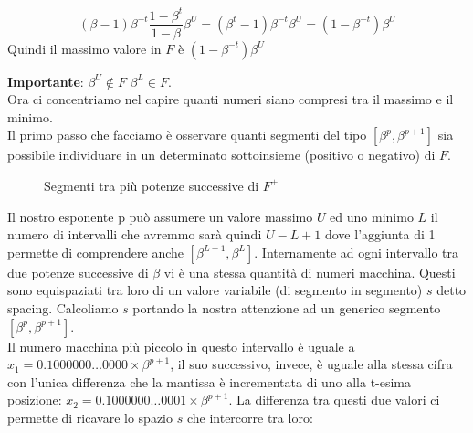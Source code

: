 \documentclass[12pt, a4paper]{book}
\theoremstyle{definition}
\begin{document}
\begin{flushleft}
\begin{itemize}
\[ (\beta -1) \beta^{-t}\frac{1-\beta^{t}}{1-\beta}\beta^{U} = (\beta^{t} - 1)\beta^{-t}\beta^{U} = (1-\beta^{-t})\beta^{U}\]
Quindi il massimo valore in $F$ è $(1-\beta^{-t})\beta^{U}$ 
\end{itemize}
\textbf{Importante}: $\beta^{U} \notin F$ $\beta^{L} \in F$.\\
\vspace{1em}
Ora ci concentriamo nel capire quanti numeri siano compresi tra il massimo e il minimo. \\
Il primo passo che facciamo è osservare quanti segmenti del tipo $[\beta^{p}, \beta^{p+1}]$ sia possibile individuare in un determinato sottoinsieme (positivo o negativo) di $F$. 

\begin{figure}[h!]
\centering
{}
\caption{Segmenti tra più potenze successive di $F^{+}$}
\label{segmenti tra potenze successive}
\end{figure}

Il nostro esponente p può assumere un valore massimo $U$ ed uno minimo $L$ il numero di intervalli che avremmo sarà quindi $U-L+1$ dove l'aggiunta di 1 permette di comprendere anche $[\beta^{L-1}, \beta^{L}]$.
\vspace{1em}
Internamente ad ogni intervallo tra due potenze successive di $\beta$ vi è una stessa quantità di numeri macchina.  Questi sono equispaziati tra loro di un valore variabile (di segmento in segmento) $s$ detto spacing.
Calcoliamo $s$ portando la nostra attenzione ad un generico segmento $[\beta^{p}, \beta^{p+1}]$. \\
Il numero macchina più piccolo in questo intervallo è uguale a $x_{1} = 0.1000000\dots0000 \times \beta^{p+1}$, il suo successivo, invece,  è uguale alla stessa cifra con l'unica differenza che la mantissa è incrementata di uno alla t-esima posizione: $x_{2}=0.1000000\dots0001 \times \beta^{p+1}$. 
La differenza tra questi due valori ci permette di ricavare lo spazio $s$ che intercorre tra loro:


\end{flushleft}
\end{document}

